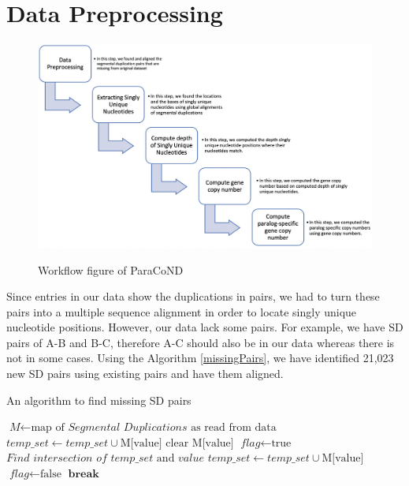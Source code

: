 \section{Data Preprocessing}
\begin{figure}
    \centering
    \caption{Workflow figure of ParaCoND}
    \includegraphics[scale=0.55]{images/workflow.png}
    \label{workflow}
\end{figure}

Since entries in our data show the duplications in pairs, we had to turn these pairs into a multiple sequence alignment in order to locate singly unique nucleotide positions. However, our data lack some pairs. For example, we have SD pairs of A-B and B-C, therefore A-C should also be in our data whereas there is not in some cases. Using the Algorithm \ref{missingPairs}, we have identified 21,023 new SD pairs using existing pairs and have them aligned.

\begin{algorithm}
\caption{An algorithm to find missing SD pairs}
\label{missingPairs}
\begin{algorithmic}[1]
\State $\textit{M} \gets \text{map of }\textit{Segmental Duplications}\text{ as read from data}$
\State $\textit{temp\_set} \gets \textit{temp\_set} \cup \text{M{[value]}}$
\State $\text{clear M{[value]}}$
\EndFor
{}
\State $\textit{flag} \gets \text{true}$
\State $\textit{Find intersection of }\textit{temp\_set}\text{ and }\textit{value}$
\State $\textit{temp\_set} \gets \textit{temp\_set} \cup \text{M{[value]}}$
\State $\textit{flag} \gets \text{false}$
\EndIf
\EndFor
{}
\State $\textbf{break}$
\EndIf
\EndWhile
\EndFor
\EndProcedure
\end{algorithmic}
\end{algorithm}

